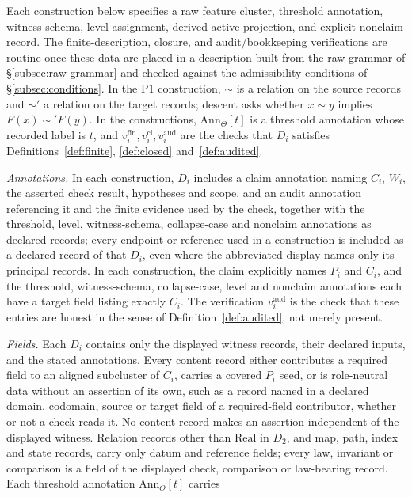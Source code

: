 \documentclass[11pt]{article}
\theoremstyle{definition}
\newcommand{\Pone}{\ensuremath{\mathrm{P1}}}
\begin{document}
Each construction below specifies a raw feature cluster, threshold
annotation, witness schema, level assignment, derived active
projection, and explicit nonclaim record. The finite-description,
closure, and audit/bookkeeping verifications are routine once these
data are placed in a description built from the raw grammar of
\S\ref{subsec:raw-grammar} and checked against the admissibility
conditions of \S\ref{subsec:conditions}. In the \Pone{} construction,
\(\sim\) is a relation on the source records and \(\sim'\) a relation on
the target records; descent asks whether \(x\sim y\) implies
\(F(x)\sim' F(y)\). In the constructions, \(\mathrm{Ann}_\Theta[t]\) is a
threshold annotation whose recorded label is \(t\), and
\(v_i^{\mathrm{fin}}, v_i^{\mathrm{cl}}, v_i^{\mathrm{aud}}\) are the checks
that \(D_i\) satisfies Definitions~\ref{def:finite}, \ref{def:closed}
and~\ref{def:audited}. \par\emph{Annotations.} In each construction, \(D_i\) includes a claim
annotation naming \(C_i\), \(W_i\), the asserted check result, hypotheses and
scope, and an audit annotation referencing it and the finite evidence used by
the check, together with the threshold, level, witness-schema, collapse-case
and nonclaim annotations as declared records; every endpoint or reference used in a
construction is included as a declared record of that \(D_i\), even where the
abbreviated display names only its principal records. In each construction,
the claim explicitly names \(P_i\) and \(C_i\), and the threshold,
witness-schema, collapse-case, level and nonclaim annotations each have a
target field listing exactly \(C_i\). The verification \(v_i^{\mathrm{aud}}\) is the check that
these entries are honest in the sense of Definition~\ref{def:audited}, not
merely present. \par\emph{Fields.} Each \(D_i\) contains only the displayed witness records, their declared
inputs, and the stated annotations. Every content record either contributes a
required field to an aligned subcluster of \(C_i\), carries a covered \(P_i\)
seed, or is role-neutral data without an assertion of its own, such as a record named
in a declared domain, codomain, source or target field of a required-field
contributor, whether or not a check reads it. No content record
makes an assertion independent of the displayed witness. Relation records
other than \(\mathrm{Real}\) in \(D_2\), and map, path, index and state
records, carry only datum and reference fields; every law,
invariant or comparison is a field of the displayed check, comparison or
law-bearing record. Each threshold annotation \(\mathrm{Ann}_\Theta[t]\) carries
\end{document}
